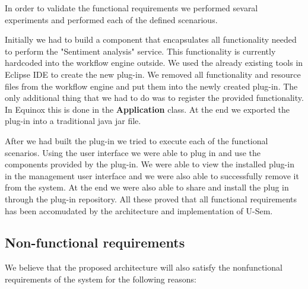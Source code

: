 In order to validate the functional requirements we performed sevaral experiments and performed each of the defined scenarious.
 
Initially we had to build a component that encapsulates all functionality needed to perform the "Sentiment analysis" service. This functionality is currently hardcoded into the workflow engine outside. We used the already existing tools in Eclipse IDE to create the new plug-in. We removed all functionality and resource files from the workflow engine and put them into the newly created plug-in. The only additional thing that we had to do was to register the provided functionality. In Equinox this is done in the \textbf{Application} class. At the end we exported the plug-in into a traditional java jar file.

After we had built the plug-in we tried to execute each of the functional scenarios. Using the user interface we were able to plug in and use the components provided by the plug-in. We were able to view the installed plug-in in the management user interface and we were also able to successfully remove it from the system. At the end we were also able to share and install the plug in through the plug-in repository. All these proved that all functional requirements has been accomudated by the architecture and implementation of U-Sem.


\subsection{Non-functional requirements}

We believe that the proposed architecture will also satisfy the nonfunctional requirements of the system for the following reasons:

